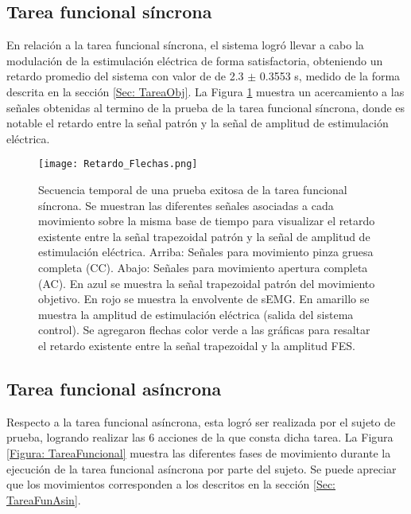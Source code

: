 \subsection{Tarea funcional síncrona}
En relación a la tarea funcional síncrona, el sistema logró llevar a cabo la modulación de la estimulación eléctrica de forma satisfactoria, obteniendo un retardo promedio del sistema con valor de de 2.3 $\pm$ 0.3553 s, medido de la forma descrita en la sección \ref{Sec: TareaObj}. La Figura \ref{Figura: Retardo} muestra un acercamiento a las señales obtenidas al termino de la prueba de la tarea funcional síncrona, donde es notable el retardo entre la señal patrón y la señal de amplitud de estimulación eléctrica.

\newpage
\begin{figure}[htbp]
	\centering
	\texttt{[image: Retardo\_Flechas.png]}
	\caption[Secuencia temporal de una prueba exitosa de la tarea funcional síncrona]{Secuencia temporal de una prueba exitosa de la tarea funcional síncrona. Se muestran las diferentes señales asociadas a cada movimiento sobre la misma base de tiempo para visualizar el retardo existente entre la señal trapezoidal patrón y la señal de amplitud de estimulación eléctrica. Arriba: Señales para movimiento pinza gruesa completa (CC). Abajo: Señales para movimiento apertura completa (AC). En azul se muestra la señal trapezoidal patrón del movimiento objetivo. En rojo se muestra la envolvente de sEMG. En amarillo se muestra la amplitud de estimulación eléctrica (salida del sistema control). Se agregaron flechas color verde a las gráficas para resaltar el retardo existente entre la señal trapezoidal y la amplitud FES.}
	\label{Figura: Retardo}
\end{figure}


\subsection{Tarea funcional asíncrona}
Respecto a la tarea funcional asíncrona, esta logró ser realizada por el sujeto de prueba, logrando realizar las 6 acciones de la que consta dicha tarea. La Figura \ref{Figura: TareaFuncional} muestra las diferentes fases de movimiento durante la ejecución de la tarea funcional asíncrona por parte del sujeto. Se puede apreciar que los movimientos corresponden a los descritos en la sección \ref{Sec: TareaFunAsin}.

